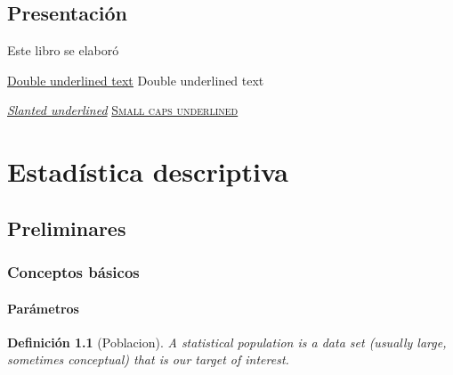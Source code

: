 \documentclass[a4paper]{report}
\newtheorem{defn}[thm]{Definición}
\begin{document}
\renewcommand\listfigurename{Lista de figuras}
\listoffigures

\renewcommand\listtablename{Lista de tablas}
\listoftables
\newpage

\clearpage

\chapter*{Presentación}

Este libro se elaboró


\underline{\underline{Double underlined text}}
{Double underlined text}

\textsl{\underline{Slanted underlined}}
\textsc{\underline{Small caps underlined}}








\part{Estadística descriptiva}
\setcounter{page}{1}

\chapter{Preliminares}
		
\section{Conceptos básicos}
\subsection{Parámetros} 
\begin{defn}[Poblacion]
	A statistical population is a data set (usually large, sometimes conceptual) that is our target of interest.
\end{defn}
\end{document}
